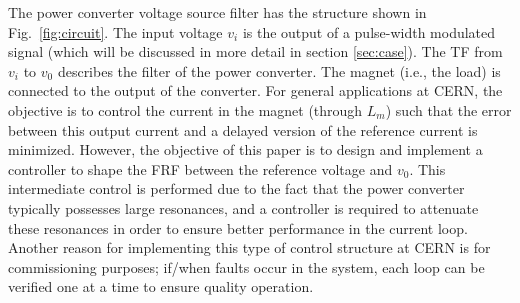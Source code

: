 \documentclass[a4paper, 10pt, conference]{ieeeconf}
\begin{document}
The power converter voltage source filter has the structure shown in Fig.~\ref{fig:circuit}. The input voltage $v_i$ is the output of a pulse-width modulated signal (which will be discussed in more detail in section \ref{sec:case}). The TF from $v_i$ to $v_0$ describes the filter of the power converter. The magnet (i.e., the load) is connected to the output of the converter. For general applications at CERN, the objective is to control the current in the magnet (through $L_m$) such that the error between this output current and a delayed version of the reference current is minimized. However, the objective of this paper is to design and implement a controller to shape the FRF between the reference voltage and $v_0$. This intermediate control is performed due to the fact that the power converter typically possesses large resonances, and a controller is required to attenuate these resonances in order to ensure better performance in the current loop. Another reason for implementing this type of control structure at CERN is for commissioning purposes; if/when faults occur in the system, each loop can be verified one at a time to ensure quality operation.
\end{document}
